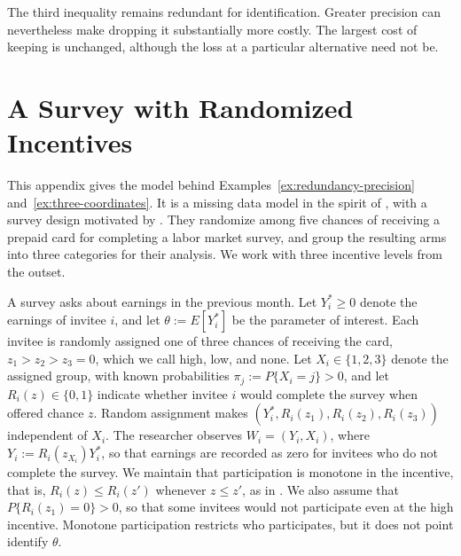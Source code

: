 \documentclass[11pt]{article}
\numberwithin{equation}{section}
\theoremstyle{definition}
\begin{document}
\begin{samepage}
The third inequality remains redundant for identification. Greater precision can nevertheless make dropping it substantially more costly. The largest cost of keeping is unchanged, although the loss at a particular alternative need not be.\par
\end{samepage}

\section{A Survey with Randomized Incentives}\label{app:randomized-incentives}

This appendix gives the model behind Examples~\ref{ex:redundancy-precision} and~\ref{ex:three-coordinates}. It is a missing data model in the spirit of \citet[Chapter~1]{manski:2003}, with a survey design motivated by \citet{dutz/etal:26}. They randomize among five chances of receiving a prepaid card for completing a labor market survey, and group the resulting arms into three categories for their analysis. We work with three incentive levels from the outset.

A survey asks about earnings in the previous month. Let $Y_i^*\ge0$ denote the earnings of invitee $i$, and let $\theta:=E[Y_i^*]$ be the parameter of interest. Each invitee is randomly assigned one of three chances of receiving the card, $z_1>z_2>z_3=0$, which we call high, low, and none. Let $X_i\in\{1,2,3\}$ denote the assigned group, with known probabilities $\pi_j:=P\{X_i=j\}>0$, and let $R_i(z)\in\{0,1\}$ indicate whether invitee $i$ would complete the survey when offered chance $z$. Random assignment makes $(Y_i^*,R_i(z_1),R_i(z_2),R_i(z_3))$ independent of $X_i$. The researcher observes $W_i=(Y_i,X_i)$, where $Y_i:=R_i(z_{X_i})Y_i^*$, so that earnings are recorded as zero for invitees who do not complete the survey. We maintain that participation is monotone in the incentive, that is, $R_i(z)\le R_i(z')$ whenever $z\le z'$, as in \citet[Section~4.4.1]{dutz/etal:26}. We also assume that $P\{R_i(z_1)=0\}>0$, so that some invitees would not participate even at the high incentive. Monotone participation restricts who participates, but it does not point identify $\theta$.
\end{document}

